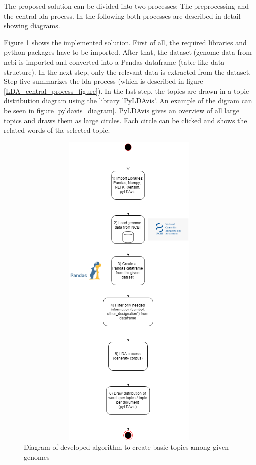The proposed solution can be divided into two processes: The preprocessing and the central \gls{lda} process. In the following both processes are described in detail showing diagrams.

Figure \ref{LDA_preprocess_figure} shows the implemented solution. First of all, the required libraries and python packages have to be imported. After that, the dataset (genome data from \gls{ncbi} is imported and converted into a Pandas dataframe (table-like data structure). In the next step, only the relevant data is extracted from the dataset. Step five summarizes the \gls{lda} process (which is described in figure \ref{LDA_central_process_figure}). In the last step, the topics are drawn in a topic distribution diagram using the library 'PyLDAvis'. An example of the digram can be seen in figure \ref{pyldavis_diagram}. PyLDAvis gives an overview of all large topics and draws them as large circles. Each circle can be clicked and shows the related words of the selected topic.

\begin{figure}[htbp]
	\centering
	\includegraphics[width=1\textwidth, height=600px, keepaspectratio]{Image/LDA_preprocess.png}
	\caption{Diagram of developed algorithm to create basic topics among given genomes}
	\label{LDA_preprocess_figure}
\end{figure}

